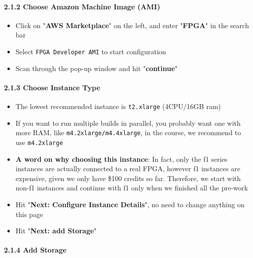\documentclass[]{article}
\let\oldparagraph\paragraph
\renewcommand{\paragraph}[1]{\oldparagraph{#1}\mbox{}}
\begin{document}
\hypertarget{header-n112}{%
\paragraph{2.1.2 Choose Amazon Machine Image (AMI)}\label{header-n112}}

\begin{itemize}
\item
  Click on "\textbf{AWS Marketplace}" on the left, and enter
  "\textbf{FPGA}" in the search bar
\item
  Select \texttt{FPGA\ Developer\ AMI} to start configuration
\item
  Scan through the pop-up window and hit "\textbf{continue}"
\end{itemize}

\hypertarget{header-n123}{%
\paragraph{2.1.3 Choose Instance Type}\label{header-n123}}

\begin{itemize}
\item
  The lowest recommended instance is \texttt{t2.xlarge} (4CPU/16GB ram)
\item
  If you want to run multiple builds in parallel, you probably want one
  with more RAM, like \texttt{m4.2xlarge/m4.4xlarge}, in the course, we
  recommend to use \texttt{m4.2xlarge}
\item
  \textbf{A word on why choosing this instance}: In fact, only the f1
  series instances are actually connected to a real FPGA, however f1
  instances are expensive, given we only have \$100 credits so far.
  Therefore, we start with non-f1 instances and continue with f1 only
  when we finished all the pre-work
\item
  Hit "\textbf{Next: Configure Instance Details}", no need to change
  anything on this page
\item
  Hit "\textbf{Next: add Storage}"
\end{itemize}

\hypertarget{header-n140}{%
\paragraph{2.1.4 Add Storage}\label{header-n140}}
\end{document}
